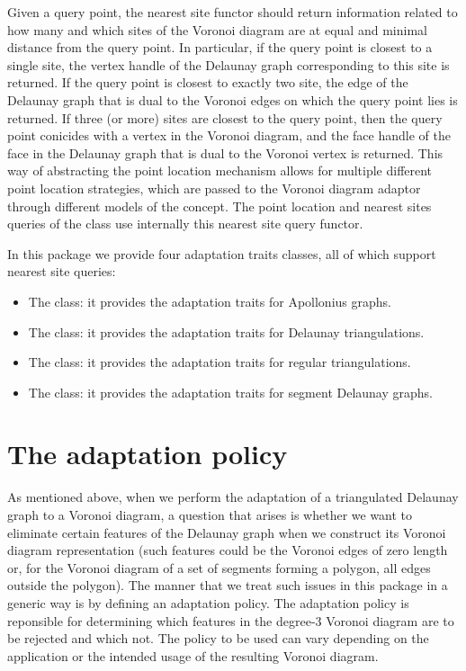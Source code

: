 Given a query point, the nearest site functor should return information 
related to how many and which sites of the Voronoi diagram are at
equal and minimal distance from the query point. In particular, if the
query point is closest to a single site, the vertex handle of the
Delaunay graph corresponding to this site is returned. If the
query point is closest to exactly two site, the edge of the
Delaunay graph that is dual to the Voronoi edges on which the query
point lies is returned. If three (or more) sites are closest to
the query point, then the query point conicides with a vertex in the
Voronoi diagram, and the face handle of the face in the Delaunay graph
that is dual to the Voronoi vertex is returned.
This way of abstracting the point location mechanism allows
for multiple different point location strategies, which are passed to
the Voronoi diagram adaptor through different models of the
 concept. The point location and nearest sites
queries of the  class use internally
this nearest site query functor.

In this package we provide four adaptation traits classes, all of which
support nearest site queries:
\begin{itemize}
\item
  The  class: it
  provides the adaptation traits for Apollonius graphs.
\item
  The  class: it
  provides the adaptation traits for Delaunay triangulations.
\item
  The  class: it
  provides the adaptation traits for regular triangulations.
\item
  The  class: it
  provides the adaptation traits for segment Delaunay graphs.
\end{itemize}

\section{The adaptation policy}
\label{sec:vda2-ap}

As mentioned above, when we perform the adaptation of a triangulated
Delaunay graph to a Voronoi diagram, a question that arises is whether
we want to eliminate certain features of the Delaunay graph when we
construct its Voronoi diagram representation (such features could be
the Voronoi edges of zero length or, for the Voronoi diagram of a set
of segments forming a polygon, all edges outside the polygon).
The manner that we treat such issues in this package in a generic way
is by defining an adaptation policy. The adaptation policy is
reponsible for determining which features in the degree-3 Voronoi
diagram are to be rejected and which not. The policy to be used can
vary depending on the application or the intended usage of the
resulting Voronoi diagram.

